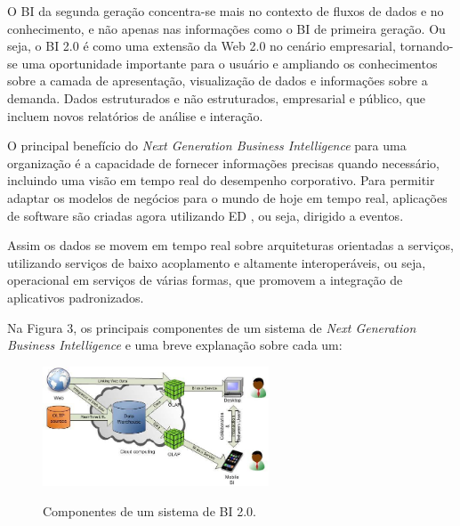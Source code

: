 O BI da segunda gera\c{c}\~{a}o concentra-se mais no contexto de fluxos de dados e no conhecimento, e n\~{a}o apenas nas informa\c{c}\~{o}es como o BI de primeira gera\c{c}\~{a}o. Ou seja, o BI 2.0 \'{e} como uma extens\~{a}o da Web 2.0 no cen\'{a}rio empresarial, tornando-se uma oportunidade importante para o usu\'{a}rio e ampliando os conhecimentos sobre a camada de apresenta\c{c}\~{a}o, visualiza\c{c}\~{a}o de dados e informa\c{c}\~{o}es sobre a demanda. Dados estruturados e n\~{a}o estruturados, empresarial e público, que incluem novos relat\'{o}rios de an\'{a}lise e intera\c{c}\~{a}o.

O principal benef\'{i}cio do \textit{Next Generation Business Intelligence} para uma organiza\c{c}\~{a}o \'{e} a capacidade de fornecer informa\c{c}\~{o}es precisas quando necess\'{a}rio, incluindo uma vis\~{a}o em tempo real do desempenho corporativo. Para permitir adaptar os modelos de neg\'{o}cios para o mundo de hoje em tempo real, aplica\c{c}\~{o}es de software s\~{a}o criadas agora utilizando ED , ou seja, dirigido a eventos. 

Assim os dados se movem em tempo real sobre arquiteturas orientadas a servi\c{c}os, utilizando servi\c{c}os de baixo acoplamento e altamente interoper\'{a}veis, ou seja, operacional em servi\c{c}os de v\'{a}rias formas, que promovem a integra\c{c}\~{a}o de aplicativos padronizados.

Na Figura 3, os principais componentes de um sistema de \textit{Next Generation Business Intelligence} e uma breve explana\c{c}\~{a}o sobre cada um:

\begin{figure}[H]
	\vspace*{0,2cm}
    \centering
    \caption{Componentes de um sistema de BI 2.0.}
    \includegraphics[width=0.6\textwidth]{./04-figuras/figura-03}
    \label{fig:ilustfig03}
\end{figure}
\vspace*{-0,9cm}
{\raggedright {}}\\


